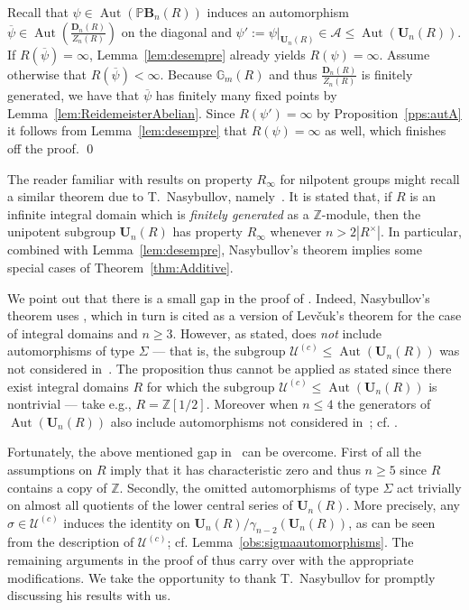 \documentclass[a4paper,11pt]{amsart}
\numberwithin{equation}{section}
\theoremstyle{plain}
\theoremstyle{definition}
\newenvironment{rmk}
  {\pushQED{\qed}\renewcommand{\qedsymbol}{$\triangle$}\rmkx}
  {\popQED\endrmkx}
\newcommand{\Z}{\mathbb{Z}}
\newcommand{\mbU}{\mathbf{U}} %
\newcommand{\mbD}{\mathbf{D}} %
\newcommand{\Mult}{\mathbb{G}_{m}} %
\newcommand{\PB}{\mathbb{P}\mathbf{B}} %
\newcommand{\barra}[1]{\overline{#1}}
\newcommand{\mc}{\mathcal}
\newcommand{\Ri}{R_{\infty}} %
\DeclareMathOperator{\Aut}{Aut}
\begin{document}
Recall that $\psi \in \Aut(\PB_n(R))$ induces an automorphism $\barra{\psi} \in \Aut\left(\frac{\mbD_n(R)}{Z_n(R)}\right)$ on the diagonal and $\psi' := \psi|_{\mbU_n(R)} \in \mc{A} \leq \Aut(\mbU_n(R))$. If $R(\barra{\psi}) = \infty$, Lemma~\ref{lem:desempre} already yields $R(\psi) = \infty$. Assume otherwise that $R(\barra{\psi}) < \infty$. Because $\Mult(R)$ and thus $\frac{\mbD_n(R)}{Z_n(R)}$ is finitely generated, we have that $\barra{\psi}$ has finitely many fixed points by Lemma~\ref{lem:ReidemeisterAbelian}. Since $R(\psi') = \infty$ by 
{Proposition~\ref{pps:autA}} it follows from Lemma~\ref{lem:desempre} that $R(\psi) = \infty$ as well, which finishes off the proof. \qed

\begin{rmk} \label{teoremadoTimur}
The reader familiar with results on property $\Ri$ for nilpotent groups might recall a similar theorem due to T.~Nasybullov, namely~\cite[Theorem~3]{TimurUniTri}. It is stated that, if $R$ is an infinite integral domain which is \emph{finitely generated} as a $\Z$-module, then the unipotent subgroup $\mbU_n(R)$ has property $\Ri$ whenever $n > 2|R^\times|$. In particular, combined with Lemma~\ref{lem:desempre}, Nasybullov's theorem implies some special cases of Theorem~\ref{thm:Additive}. 

We point out that there is a small gap in the proof of \cite[Theorem~3]{TimurUniTri}. 
Indeed, Nasybullov's theorem uses \cite[Proposition~7]{TimurUniTri}, which in turn is cited as a version of Lev\v{c}uk's theorem for the case of integral domains and $n \geq 3$. However, as stated, \cite[Proposition~7]{TimurUniTri} does \emph{not} include automorphisms of type $\Sigma$ --- that is, the subgroup $\mc{U}^{(c)} \leq \Aut(\mbU_n(R))$ was not considered in~\cite{TimurUniTri}. The proposition thus cannot be applied as stated since there exist integral domains $R$ for which the subgroup $\mc{U}^{(c)} \leq \Aut(\mbU_n(R))$ is nontrivial --- take e.g., $R = \Z[1/2]$. Moreover when $n \leq 4$ the generators of $\Aut(\mbU_n(R))$ also include automorphisms not considered in~\cite{TimurUniTri}; cf. \cite[Theorems~2 and~3 and Corollary~5]{LevchukOriginal}.

Fortunately, the above mentioned gap in~\cite[Theorem~3]{TimurUniTri} can be overcome. First of all the assumptions on $R$ imply that it has characteristic zero and thus $n \geq 5$ since $R$ contains a copy of $\Z$. Secondly, the omitted automorphisms of type $\Sigma$ act trivially on almost all quotients of the lower central series of $\mbU_n(R)$. More precisely, any $\sigma \in \mc{U}^{(c)}$ induces the identity on $\mbU_n(R) / \gamma_{n-2}(\mbU_n(R))$, as can be seen from the description of $\mc{U}^{(c)}$; cf. Lemma~\ref{obs:sigmaautomorphisms}. The remaining arguments in the proof of \cite[Theorem~3]{TimurUniTri} thus carry over with the appropriate modifications. We take the opportunity to thank T.~Nasybullov for promptly discussing his results with us. 
\end{rmk}
\end{document}
